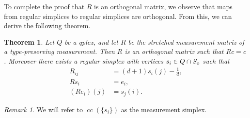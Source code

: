 \documentclass[aps,pra,superscriptaddress,10pt,tightenlines,twocolumn,nofootinbib]{revtex4}
\newtheorem{theorem}{Theorem}
\theoremstyle{remark}
\newtheorem*{remark}{Remark}
\newcommand{\ea}[1]{\begin{align}#1\end{align}}
\newcommand{\so}{S_{\rm{o}}}
\newcommand{\qp}{Q}
\newcommand{\qplex}{qplex}
\DeclareMathOperator{\cc}{cc}
\begin{document}
To complete the proof that $R$ is an orthogonal matrix, we observe that maps from regular simplices to regular simplices are orthogonal.  From this, we can derive the following theorem.
\begin{theorem}
\label{thm:TPreserveMapTheorem1}
Let $\qp$ be a \qplex, and let $R$ be the stretched measurement matrix of a type-preserving measurement.  Then $R$ is an orthogonal matrix such that $Rc=c$.   Moreover there exists a regular simplex with vertices $s_i \in \qp\cap\so$ such that
\ea{
R_{ij} &= (d+1)s_i(j) -\frac{1}{d},
\label{eq:MeasMatTermsSimp}
\\
Rs_i &= e_i,
\\
(Re_i)(j) &= s_j(i).
}
\end{theorem}
\begin{remark}
We will refer to  $\cc(\{s_i\})$ as the measurement simplex.
\end{remark}
\end{document}
